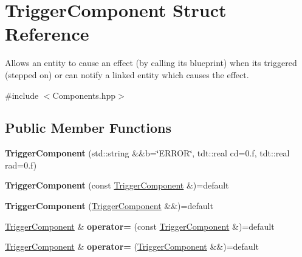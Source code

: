\hypertarget{struct_trigger_component}{}\section{Trigger\+Component Struct Reference}
\label{struct_trigger_component}


Allows an entity to cause an effect (by calling it\textquotesingle{}s blueprint) when its triggered (stepped on) or can notify a linked entity which causes the effect.  




{\ttfamily \#include $<$Components.\+hpp$>$}

\subsection*{Public Member Functions}
\begin{DoxyCompactItemize}
\item 
{\bfseries Trigger\+Component} (std\+::string \&\&b=\char`\"{}E\+R\+R\+OR\char`\"{}, tdt\+::real cd=0.f, tdt\+::real rad=0.f)\hypertarget{struct_trigger_component_a78f61e4f767d3bd308627ef10542e46b}{}\label{struct_trigger_component_a78f61e4f767d3bd308627ef10542e46b}

\item 
{\bfseries Trigger\+Component} (const \hyperlink{struct_trigger_component}{Trigger\+Component} \&)=default\hypertarget{struct_trigger_component_a7e972116c79f441d6642935b98dd52d5}{}\label{struct_trigger_component_a7e972116c79f441d6642935b98dd52d5}

\item 
{\bfseries Trigger\+Component} (\hyperlink{struct_trigger_component}{Trigger\+Component} \&\&)=default\hypertarget{struct_trigger_component_a53b7f4db491e1a370bbf1953d0f2de61}{}\label{struct_trigger_component_a53b7f4db491e1a370bbf1953d0f2de61}

\item 
\hyperlink{struct_trigger_component}{Trigger\+Component} \& {\bfseries operator=} (const \hyperlink{struct_trigger_component}{Trigger\+Component} \&)=default\hypertarget{struct_trigger_component_ace8396908728c271c1fb76a4dd0e9910}{}\label{struct_trigger_component_ace8396908728c271c1fb76a4dd0e9910}

\item 
\hyperlink{struct_trigger_component}{Trigger\+Component} \& {\bfseries operator=} (\hyperlink{struct_trigger_component}{Trigger\+Component} \&\&)=default\hypertarget{struct_trigger_component_ad15b8d568aa50e67223914cc4063082c}{}\label{struct_trigger_component_ad15b8d568aa50e67223914cc4063082c}

\end{DoxyCompactItemize}
